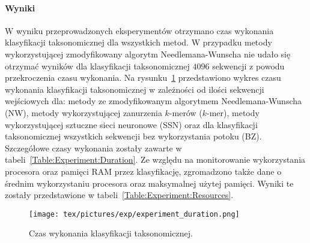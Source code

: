 \documentclass{article}
\begin{document}
{            \paragraph{Wyniki}
                W wyniku przeprowadzonych eksperymentów otrzymano czas wykonania klasyfikacji taksonomicznej dla wszystkich metod. W przypadku metody wykorzystującej zmodyfikowany algorytm Needlemana-Wunscha nie udało się otrzymać wyników dla klasyfikacji taksonomicznej $4096$ sekwencji z powodu przekroczenia czasu wykonania. Na rysunku~\ref{Picture:Experiment:Duration} przedstawiono wykres czasu wykonania klasyfikacji taksonomicznej w zależności od ilości sekwencji wejściowych dla: metody ze zmodyfikowanym algorytmem Needlemana-Wunscha (NW), metody wykorzystującej zanurzenia $k$-merów ($k$-mer), metody wykorzystującej sztuczne sieci neuronowe (SSN) oraz dla klasyfikacji taksonomicznej wszystkich sekwencji bez wykorzystania potoku (BZ). Szczegółowe czasy wykonania zostały zawarte w tabeli~\ref{Table:Experiment:Duration}. Ze względu na monitorowanie wykorzystania procesora oraz pamięci RAM przez klasyfikację, zgromadzono także dane o średnim wykorzystaniu procesora oraz maksymalnej użytej pamięci. Wyniki te zostały przedstawione w tabeli~\ref{Table:Experiment:Resources}.

                \begin{figure}[!htb]
                    \begin{center}
                        \texttt{[image: tex/pictures/exp/experiment\_duration.png]}
                    \end{center}
                    \caption{
                        Czas wykonania klasyfikacji taksonomicznej.
                    }\label{Picture:Experiment:Duration}
                \end{figure}

}
\end{document}
